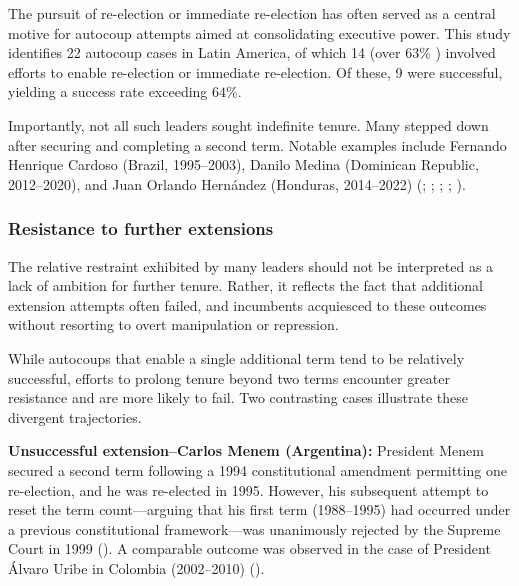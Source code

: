 \documentclass[
  12pt,
]{report}
\begin{document}
The pursuit of re-election or immediate re-election has often served as
a central motive for autocoup attempts aimed at consolidating executive
power. This study identifies 22 autocoup cases in Latin America, of
which 14 (over \(63\%\) ) involved efforts to enable re-election or
immediate re-election. Of these, 9 were successful, yielding a success
rate exceeding \(64\%\).

Importantly, not all such leaders sought indefinite tenure. Many stepped
down after securing and completing a second term. Notable examples
include Fernando Henrique Cardoso (Brazil, 1995--2003), Danilo Medina
(Dominican Republic, 2012--2020), and Juan Orlando Hernández (Honduras,
2014--2022) (;
;
;
; ).

\subsubsection*{Resistance to further
extensions}\label{resistance-to-further-extensions}

The relative restraint exhibited by many leaders should not be
interpreted as a lack of ambition for further tenure. Rather, it
reflects the fact that additional extension attempts often failed, and
incumbents acquiesced to these outcomes without resorting to overt
manipulation or repression.

While autocoups that enable a single additional term tend to be
relatively successful, efforts to prolong tenure beyond two terms
encounter greater resistance and are more likely to fail. Two
contrasting cases illustrate these divergent trajectories.

\textbf{Unsuccessful extension--Carlos Menem (Argentina):} President
Menem secured a second term following a 1994 constitutional amendment
permitting one re-election, and he was re-elected in 1995. However, his
subsequent attempt to reset the term count---arguing that his first term
(1988--1995) had occurred under a previous constitutional
framework---was unanimously rejected by the Supreme Court in 1999
(). A comparable outcome was
observed in the case of President Álvaro Uribe in Colombia (2002--2010)
().
\end{document}
